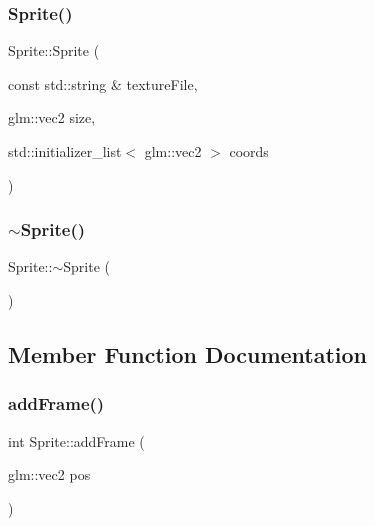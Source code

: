 \mbox{\label{classsage_1_1Sprite_a4ed2be3fab0b4869728be4f91cb67169}} 
\subsubsection{\texorpdfstring{Sprite()}{Sprite()}\hspace{0.1cm}{\footnotesize\ttfamily [3/3]}}
{\footnotesize\ttfamily Sprite\+::\+Sprite (\begin{DoxyParamCaption}\item[{const std\+::string \&}]{texture\+File,  }\item[{glm\+::vec2}]{size,  }\item[{std\+::initializer\+\_\+list$<$ glm\+::vec2 $>$}]{coords }\end{DoxyParamCaption})}

\mbox{\label{classsage_1_1Sprite_a8accab430f9d90ae5117b57d67e32b84}} 
\subsubsection{\texorpdfstring{$\sim$Sprite()}{~Sprite()}}
{\footnotesize\ttfamily Sprite\+::$\sim$\+Sprite (\begin{DoxyParamCaption}{ }\end{DoxyParamCaption})}



\subsection{Member Function Documentation}
\mbox{\label{classsage_1_1Sprite_a7444391256eab0cf1b7a994885026352}} 
\subsubsection{\texorpdfstring{addFrame()}{addFrame()}}
{\footnotesize\ttfamily int Sprite\+::add\+Frame (\begin{DoxyParamCaption}\item[{glm\+::vec2}]{pos }\end{DoxyParamCaption})}

